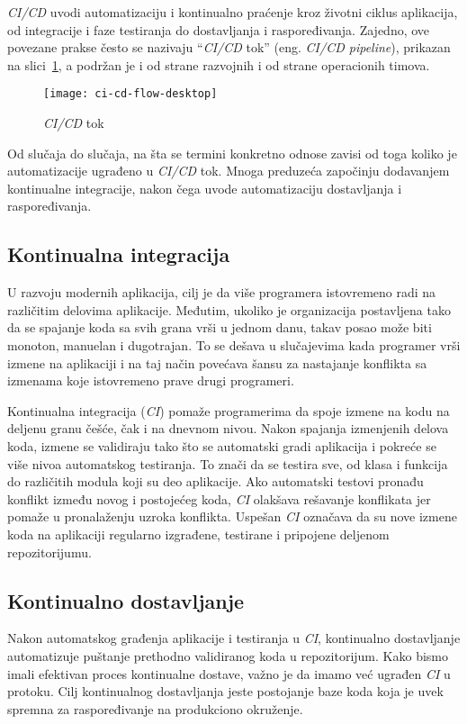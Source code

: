 \textit{CI/CD} uvodi automatizaciju i kontinualno praćenje kroz životni ciklus aplikacija, 
od integracije i faze testiranja do dostavljanja i raspoređivanja. Zajedno, ove povezane prakse 
često se nazivaju “\textit{CI/CD} tok” (eng. \textit{CI/CD pipeline}), prikazan na slici~\ref{fig:cicd}, 
a podržan je i od strane razvojnih i od strane operacionih timova.

\begin{figure}[h]
    \centering
    \texttt{[image: ci-cd-flow-desktop]}
    \caption{\textit{CI/CD} tok}
    \label{fig:cicd}
\end{figure}

Od slučaja do slučaja, na šta se termini konkretno odnose zavisi od toga koliko je automatizacije 
ugrađeno u \textit{CI/CD} tok. Mnoga preduzeća započinju dodavanjem kontinualne integracije, 
nakon čega uvode automatizaciju dostavljanja i raspoređivanja.

\subsection{Kontinualna integracija}
U razvoju modernih aplikacija, cilj je da više programera istovremeno radi na različitim delovima 
aplikacije. Međutim, ukoliko je organizacija postavljena tako da se spajanje koda sa svih grana 
vrši u jednom danu, takav posao može biti monoton, manuelan i dugotrajan. To se dešava u slučajevima 
kada programer vrši izmene na aplikaciji i na taj način povećava šansu za nastajanje konflikta sa 
izmenama koje istovremeno prave drugi programeri.

Kontinualna integracija (\textit{CI}) pomaže programerima da spoje izmene na kodu na deljenu granu češće, 
čak i na dnevnom nivou. Nakon spajanja izmenjenih delova koda, izmene se validiraju tako što se 
automatski gradi aplikacija i pokreće se više nivoa automatskog testiranja. To znači da se testira 
sve, od klasa i funkcija do različitih modula koji su deo aplikacije. Ako automatski testovi pronađu 
konflikt između novog i postojećeg koda, \textit{CI} olakšava rešavanje konflikata jer pomaže u 
pronalaženju uzroka konflikta. Uspešan \textit{CI} označava da su nove izmene koda 
na aplikaciji regularno izgrađene, testirane i pripojene deljenom repozitorijumu.

\subsection{Kontinualno dostavljanje}
Nakon automatskog građenja aplikacije i testiranja u \textit{CI}, kontinualno dostavljanje automatizuje 
puštanje prethodno validiranog koda u repozitorijum. Kako bismo imali efektivan proces kontinualne 
dostave, važno je da imamo već ugrađen \textit{CI} u protoku. Cilj kontinualnog dostavljanja jeste postojanje 
baze koda koja je uvek spremna za raspoređivanje na produkciono okruženje.

